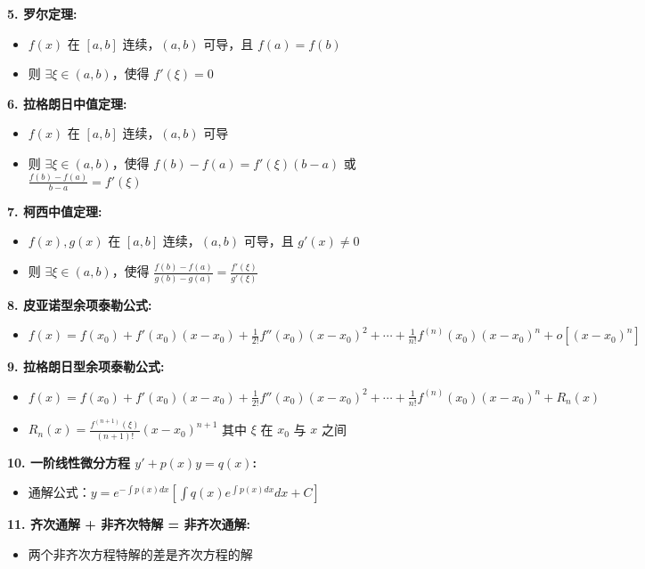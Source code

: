 \documentclass[10pt]{article}
\begin{document}
\begin{multicols*}{2}
\textbf{5. 罗尔定理:}
\begin{itemize}
  \item \(f(x)\) 在 \([a, b]\) 连续，\((a, b)\) 可导，且 \(f(a) = f(b)\)
  \item 则 \(\exists \xi \in (a, b)\)，使得 \(f'(\xi) = 0\)
\end{itemize}

\textbf{6. 拉格朗日中值定理:}
\begin{itemize}
  \item \(f(x)\) 在 \([a, b]\) 连续，\((a, b)\) 可导
  \item 则 \(\exists \xi \in (a, b)\)，使得 \(f(b) - f(a) = f'(\xi)(b - a)\) 或 \(\frac{f(b) - f(a)}{b - a} = f'(\xi)\)
\end{itemize}

\textbf{7. 柯西中值定理:}
\begin{itemize}
  \item \(f(x), g(x)\) 在 \([a, b]\) 连续，\((a, b)\) 可导，且 \(g'(x) \neq 0\)
  \item 则 \(\exists \xi \in (a, b)\)，使得 \(\frac{f(b) - f(a)}{g(b) - g(a)} = \frac{f'(\xi)}{g'(\xi)}\)
\end{itemize}

\textbf{8. 皮亚诺型余项泰勒公式:}
\begin{itemize}
  \item \(f(x) = f(x_0) + f'(x_0)(x - x_0) + \frac{1}{2!}f''(x_0)(x - x_0)^2 + \cdots + \frac{1}{n!}f^{(n)}(x_0)(x - x_0)^n + o[(x - x_0)^n]\)
\end{itemize}

\textbf{9. 拉格朗日型余项泰勒公式:}
\begin{itemize}
  \item \(f(x) = f(x_0) + f'(x_0)(x - x_0) + \frac{1}{2!}f''(x_0)(x - x_0)^2 + \cdots + \frac{1}{n!}f^{(n)}(x_0)(x - x_0)^n + R_n(x)\)
  \item \(R_n(x) = \frac{f^{(n+1)}(\xi)}{(n+1)!}(x - x_0)^{n+1}\) 其中 \(\xi\) 在 \(x_0\) 与 \(x\) 之间
\end{itemize}

\textbf{10. 一阶线性微分方程 \(y' + p(x)y = q(x)\):}
\begin{itemize}
  \item 通解公式：\(y = e^{-\int p(x)dx} \left[ \int q(x) e^{\int p(x)dx} dx + C \right]\)
\end{itemize}

\textbf{11. 齐次通解 + 非齐次特解 = 非齐次通解:}
\begin{itemize}
  \item 两个非齐次方程特解的差是齐次方程的解
\end{itemize}


\end{multicols*}
\end{document}
